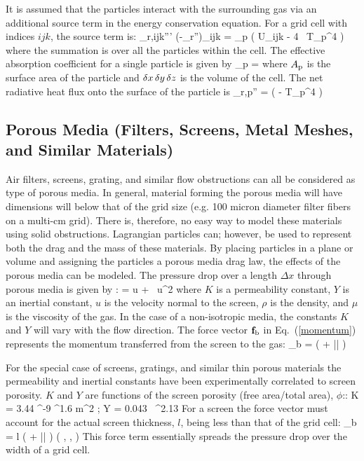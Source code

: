 It is assumed that the particles interact with the surrounding gas via an additional source term in the energy conservation equation. For a grid cell with indices $ijk$, the source term is:
\be \label{eq:qr}
   \dq_{{\rm r},ijk}''' \equiv (-\nabla \cdot \dot{\bq}_{\rm r}'')_{ijk} = \sum \kappa_{\rm p} \left( U_{ijk} - 4 \sigma \, T_{\rm p}^4 \right)
\ee
where the summation is over all the particles within the cell. The effective absorption coefficient for a single particle is given by
\be
   \kappa_{\rm p} = 
\ee
where $A_{\rm p}$ is the surface area of the particle and $\delta x \, \delta y \, \delta z$ is the volume of the cell. The net radiative heat flux onto the surface of the particle is
\be
   \dq_{\rm r,p}'' = \epsilon \left(  - \sigma T_{\rm p}^4 \right)
\ee


\subsection{Porous Media (Filters, Screens, Metal Meshes, and Similar Materials)}

Air filters, screens, grating, and similar flow obstructions can all be considered
as type of porous media. In general, material forming the porous media will have dimensions will below that of the grid size (e.g. 100 micron diameter filter fibers on a multi-cm grid).  There is, therefore, no easy way to model these materials using solid obstructions. Lagrangian particles can; however, be used to represent both the drag and the mass of these materials. By placing particles in a plane or volume and assigning the particles a porous media drag law, the effects of the porous media can be modeled. The pressure drop over a length $\Delta x$ through porous media is given by \cite{VafaiTien:1981}:
\be
    =   u + \rho {} \, u^2
\ee
where $K$ is a permeability constant, $Y$ is an inertial constant, $u$ is the velocity normal to the screen, $\rho$ is the density, and $\mu$ is the viscosity of the gas. In the case of a non-isotropic media, the constants $K$ and $Y$ will vary with the flow direction.
The force vector ${\mathbf{f}}_{\rm b}$ in Eq.~(\ref{momentum}) represents the momentum transferred from the screen to the gas:
\be
   \bof_{\rm b} = \left(  + \rho {} |\bu| \right) \bu
\ee

For the special case of screens, gratings, and similar thin porous materials the permeability and inertial constants have been experimentally correlated to screen porosity.  $K$ and $Y$ are functions of the screen porosity (free area/total area), $\phi$:\cite{Bartzanas:1}:
\be
   K = 3.44 ^{-9} \; \phi^{1.6} \; \; \hbox{m}^2 \quad ; \quad Y = 0.043 \, \phi^{2.13}
\ee
For a screen the force vector must account for the actual screen thickness, $l$, being less than that of the grid cell:
\be
   \bof_{\rm b} = l \; \left(  + \rho {} |\bu| \right) \left(  ,  ,  \right)
\ee
This force term essentially spreads the pressure drop over the width of a grid cell.


